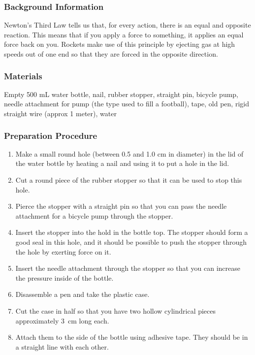 \subsubsection*{Background Information}
Newton's Third Law tells us that, for every action, there is an equal and opposite reaction.  This means that if you apply a force to something, it applies an equal force back on you.  Rockets make use of this principle by ejecting gas at high speeds out of one end so that they are forced in the opposite direction.

\subsubsection*{Materials}
Empty 500 mL water bottle, nail, rubber stopper, straight pin, bicycle pump, needle attachment for pump (the type used to fill a football), tape, old pen, rigid straight wire (approx 1 meter), water

\subsubsection*{Preparation Procedure}
\begin{enumerate}
\item{Make a small round hole (between 0.5 and 1.0 cm in diameter) in the lid of the water bottle by heating a nail and using it to put a hole in the lid.}
\item{Cut a round piece of the rubber stopper so that it can be used to stop this hole.}
\item{Pierce the stopper with a straight pin so that you can pass the needle attachment for a bicycle pump through the stopper.}
\item{Insert the stopper into the hold in the bottle top. The stopper should form a good seal in this hole, and it should be possible to push the stopper through the hole by exerting force on it.}
\item{Insert the needle attachment through the stopper so that you can increase the pressure inside of the bottle.}
\item{Disassemble a pen and take the plastic case.}
\item{Cut the case in half so that you have two hollow cylindrical pieces approximately 3~cm long each.}
\item{Attach them to the side of the bottle using adhesive tape. They should be in a straight line with each other.} 
\end{enumerate}

